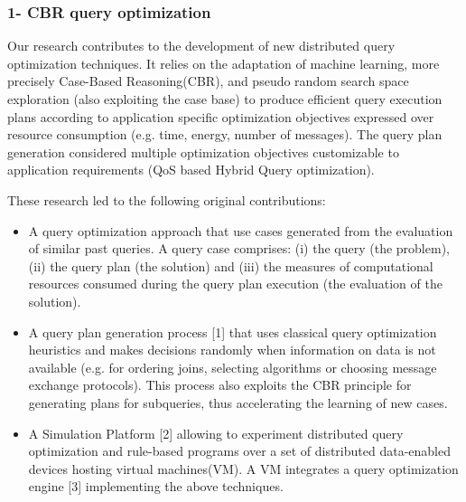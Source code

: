 \subsubsection*{1- CBR query optimization}


Our research contributes to the development of new distributed query optimization techniques. It relies on the adaptation of machine learning, more precisely Case-Based Reasoning(CBR), and pseudo random search space exploration (also exploiting the case base) to produce efficient  query execution plans according to application specific optimization objectives expressed over resource consumption (e.g. time, energy, number of messages).  The query plan generation considered multiple optimization objectives customizable to application requirements (QoS based Hybrid Query optimization).

These research led to the following original contributions:
\begin{itemize}
\item  A query optimization approach that use cases generated from the evaluation of similar past queries. A query case comprises: (i) the query (the problem), (ii) the query plan (the solution) and (iii) the measures of computational resources consumed during the query plan execution (the evaluation of the solution). 

\item  A query plan generation process [1] that uses classical query optimization heuristics and makes decisions randomly when information on data is not available (e.g. for ordering joins, selecting algorithms or choosing message exchange protocols). This process also exploits the CBR principle for generating plans for subqueries, thus accelerating the learning of new cases. 

\item  A Simulation Platform [2] allowing to experiment distributed query optimization and rule-based programs over a set of distributed data-enabled devices hosting virtual machines(VM). A VM integrates a query optimization engine [3] implementing the above techniques. 
\end{itemize}

